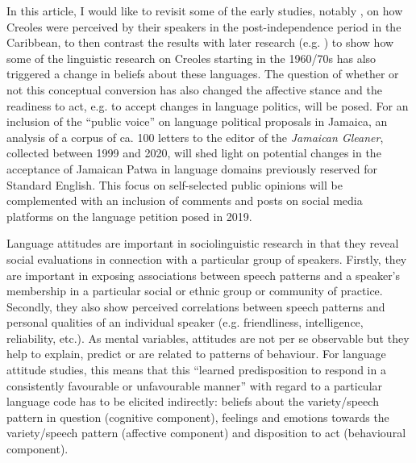 \documentclass[output=paper,colorlinks,citecolor=brown]{langscibook}
\begin{document}
In this article, I would like to revisit some of the early studies, notably \citet{winford1976teacher}, on how Creoles were perceived by their speakers in the post-independence period in the Caribbean, to then contrast the results with later research (e.g. \citealt{mühleisen1993attitudes,mühleisen2001bad,BeckfordWassink1999}) to show how some of the linguistic research on Creoles starting in the 1960/70s has also triggered a change in beliefs about these languages. The question of whether or not this conceptual conversion has also changed the affective stance and the readiness to act, e.g. to accept changes in language politics, will be posed. For an inclusion of the “public voice” on language political proposals in Jamaica, an analysis of a corpus of ca. 100 letters to the editor of the \textit{Jamaican Gleaner}, collected between 1999 and 2020, will shed light on potential changes in the acceptance of Jamaican Patwa in language domains previously reserved for Standard English. This focus on self-selected public opinions will be complemented with an inclusion of comments and posts on social media platforms on the language petition posed in 2019.

Language attitudes are important in sociolinguistic research in that they reveal social evaluations in connection with a particular group of speakers. Firstly, they are important in exposing associations between speech patterns and a speaker’s membership in a particular social or ethnic group or community of practice. Secondly, they also show perceived correlations between speech patterns and personal qualities of an individual speaker (e.g. friendliness, intelligence, reliability, etc.). As mental variables, attitudes are not per se observable but they help to explain, predict or are related to patterns of behaviour. For language attitude studies, this means that this “learned predisposition to respond in a consistently favourable or unfavourable manner” \citep[6]{fishbein1975belief} with regard to a particular language code has to be elicited indirectly: beliefs about the variety/speech pattern in question (cognitive component), feelings and emotions towards the variety/speech pattern (affective component) and disposition to act (behavioural component).
\end{document}
